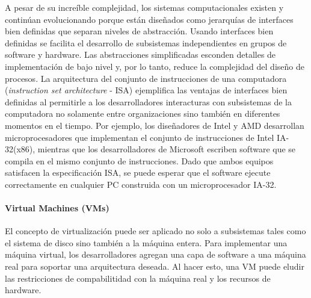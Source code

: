A pesar de su increíble complejidad, los sistemas computacionales existen y continúan evolucionando porque están diseñados como jerarquías de interfaces bien definidas que separan niveles de abstracción. Usando interfaces bien definidas se facilita el desarrollo de subsistemas independientes en grupos de software y hardware. Las abstracciones simplificadas esconden detalles de implementación de bajo nivel y, por lo tanto, reduce la complejidad del diseño de procesos. La arquitectura del conjunto de instrucciones de una computadora (\textit{instruction set architecture} - ISA) ejemplifica las ventajas de interfaces bien definidas al permitirle a los desarrolladores interacturas con subsistemas de la computadora no solamente entre organizaciones sino también en diferentes momentos en el tiempo. Por ejemplo, los diseñadores de Intel y AMD desarrollan microprocesadores que implementan el conjunto de instrucciones de Intel IA-32(x86), mientras que los desarrolladores de Microsoft escriben software que se compila en el mismo conjunto de instrucciones. Dado que ambos equipos satisfacen la especificación ISA, se puede esperar que el software ejecute correctamente en cualquier PC construida con un microprocesador IA-32.

\paragraph{\textnormal{\textbf{Virtual Machines (VMs)}}}
El concepto de virtualización puede ser aplicado no solo a subsistemas tales como el sistema de disco sino también a la máquina entera. Para implementar una máquina virtual, los desarrolladores agregan una capa de software a una máquina real para soportar una arquitectura deseada. Al hacer esto, una VM puede eludir las restricciones de compabilitidad con la máquina real y los recursos de hardware.

